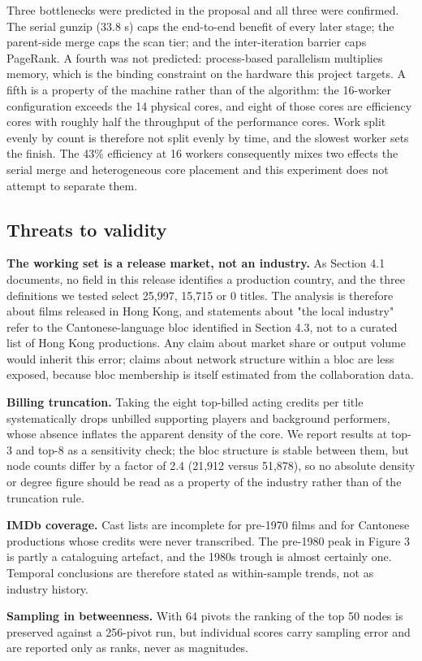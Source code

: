 Three bottlenecks were predicted in the proposal and all three were confirmed. The serial gunzip (33.8 s) caps the end-to-end benefit of every later stage; the parent-side merge caps the scan tier; and the inter-iteration barrier caps PageRank. A fourth was not predicted: process-based parallelism multiplies memory, which is the binding constraint on the hardware this project targets. A fifth is a property of the machine rather than of the algorithm: the 16-worker configuration exceeds the 14 physical cores, and eight of those cores are efficiency cores with roughly half the throughput of the performance cores. Work split evenly by count is therefore not split evenly by time, and the slowest worker sets the finish. The 43\% efficiency at 16 workers consequently mixes two effects \textemdash{} the serial merge and heterogeneous core placement \textemdash{} and this experiment does not attempt to separate them.

\subsection{Threats to validity}

\textbf{The working set is a release market, not an industry.} As Section 4.1 documents, no field in this release identifies a production country, and the three definitions we tested select 25,997, 15,715 or 0 titles. The analysis is therefore about films released in Hong Kong, and statements about "the local industry" refer to the Cantonese-language bloc identified in Section 4.3, not to a curated list of Hong Kong productions. Any claim about market share or output volume would inherit this error; claims about network structure within a bloc are less exposed, because bloc membership is itself estimated from the collaboration data.

\textbf{Billing truncation.} Taking the eight top-billed acting credits per title systematically drops unbilled supporting players and background performers, whose absence inflates the apparent density of the core. We report results at top-3 and top-8 as a sensitivity check; the bloc structure is stable between them, but node counts differ by a factor of 2.4 (21,912 versus 51,878), so no absolute density or degree figure should be read as a property of the industry rather than of the truncation rule.

\textbf{IMDb coverage.} Cast lists are incomplete for pre-1970 films and for Cantonese productions whose credits were never transcribed. The pre-1980 peak in Figure 3 is partly a cataloguing artefact, and the 1980s trough is almost certainly one. Temporal conclusions are therefore stated as within-sample trends, not as industry history.

\textbf{Sampling in betweenness.} With 64 pivots the ranking of the top 50 nodes is preserved against a 256-pivot run, but individual scores carry sampling error and are reported only as ranks, never as magnitudes.
